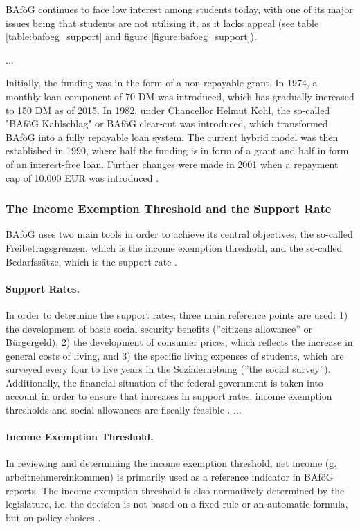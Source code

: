 BAföG continues to face low interest among students today, with one of its major issues being that students are not utilizing it, as it lacks appeal (see table \ref{table:bafoeg_support} and figure \ref{figure:bafoeg_support}). 

...

Initially, the funding was in the form of a non-repayable grant. In 1974, a monthly loan component of 70 DM was introduced, which has gradually increased to 150 DM as of 2015. In 1982, under Chancellor Helmut Kohl, the so-called "BAföG Kahlschlag" or BAföG clear-cut was introduced, which transformed BAföG into a fully repayable loan system. The current hybrid model was then established in 1990, where half the funding is in form of a grant and half in form of an interest-free loan. Further changes were made in 2001 when a repayment cap of 10.000 EUR was introduced \citep{staack_von_2017}.


\subsubsection{The Income Exemption Threshold and the Support Rate}
\label{subsection:the-income-exemption-threshold-and-the-support-rate}
BAföG uses two main tools in order to achieve its central objectives, the so-called Freibetragsgrenzen, which is the income exemption threshold, and the so-called Bedarfssätze, which is the support rate \citep{meier_bafog_2024}.

\paragraph{Support Rates.}
In order to determine the support rates, three main reference points are used: 1) the development of basic social security benefits (”citizens allowance” or Bürgergeld), 2) the development of consumer prices, which reflects the increase in general costs of living, and 3) the specific living expenses of students, which are surveyed every four to five years in the Sozialerhebung (”the social survey”). Additionally, the financial situation of the federal government is taken into account in order to ensure that increases in support rates, income exemption thresholds and social allowances are fiscally feasible \citep{meier_bafog_2024}.
...

\paragraph{Income Exemption Threshold.}
In reviewing and determining the income exemption threshold, net income (g. arbeitnehmereinkommen) is primarily used as a reference indicator in BAföG reports. The income exemption threshold is also normatively determined by the legislature, i.e. the decision is not based on a fixed rule or an automatic formula, but on policy choices \citep{meier_bafog_2024}.


